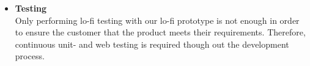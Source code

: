 \begin{itemize}
    \item{\textbf{Testing}} \\
    Only performing lo-fi testing with our lo-fi prototype is not enough in order to ensure the customer that the product meets their requirements. Therefore, continuous unit- and web testing is required though out the development process. 

\end{itemize}







